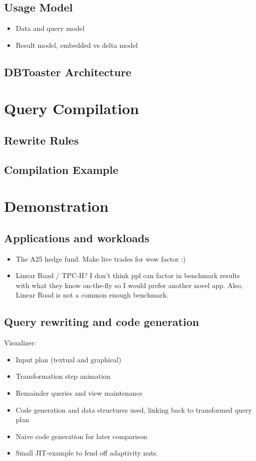 \documentclass{vldb}
\begin{document}
\subsection{Usage Model}
\begin{itemize}
  \item Data and query model
  \item Result model, embedded vs delta model
\end{itemize}

\subsection{DBToaster Architecture}

\section{Query Compilation}

\subsection{Rewrite Rules}

\subsection{Compilation Example}

\section{Demonstration}

\subsection{Applications and workloads}
\begin{itemize}
  \item The A25 hedge fund. Make live trades for wow factor :)
  \item Linear Road / TPC-H? I don't think ppl can factor in benchmark results
  with what they know on-the-fly so I would prefer another novel app. Also,
  Linear Road is not a common enough benchmark.
\end{itemize}

\subsection{Query rewriting and code generation}

Visualizer:
\begin{itemize}
  \item Input plan (textual and graphical)
  \item Transformation step animation
  \item Remainder queries and view maintenance
  \item Code generation and data structures used, linking
  back to transformed query plan
  \item Naive code generation for later comparison
  \item Small JIT-example to fend off adaptivity nuts.
\end{itemize}
\end{document}
